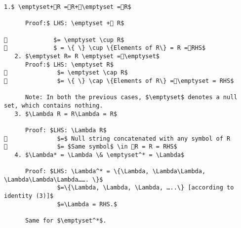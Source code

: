 \begin{lstlisting}[mathescape=true]
   1.$ \emptyset+R =R+\emptyset =R$

      Proof:$ LHS: \emptyset + R$

             $= \emptyset \cup R$
             $ = \{ \} \cup \{Elements of R\} = R =RHS$
   2. $\emptyset R= R \emptyset =\emptyset$
      Proof:$ LHS: \emptyset R$
              $= \emptyset \cap R$
              $= \{ \} \cap \{Elements of R\} =\emptyset = RHS$

      Note: In both the previous cases, $\emptyset$ denotes a null set, which contains nothing.
   3. $\Lambda R = R\Lambda = R$

      Proof: $LHS: \Lambda R$
              $=$ Null string concatenated with any symbol of R
              $= $Same symbol$ \in R = R = RHS$
   4. $\Lambda* = \Lambda \& \emptyset^* = \Lambda$

      Proof: $LHS: \Lambda^* = \{\Lambda, \Lambda\Lambda, \Lambda\Lambda\Lambda……. \}$
               $=\{\Lambda, \Lambda, \Lambda, …..\} [according to identity (3)]$
               $=\Lambda = RHS.$

      Same for $\emptyset^*$.
\end{lstlisting}
 
